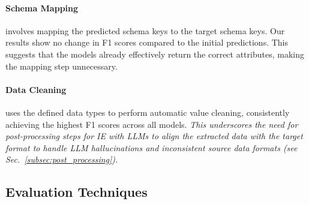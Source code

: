 \paragraph{Schema Mapping} involves mapping the predicted schema keys to the target schema keys. Our results show no change in F1 scores compared to the initial predictions. This suggests that the models already effectively return the correct attributes, making the mapping step unnecessary.

\paragraph{Data Cleaning} uses the defined data types to perform automatic value cleaning, consistently achieving the highest F1 scores across all models. \emph{This underscores the need for post-processing steps for IE with LLMs to align the extracted data with the target format to handle LLM hallucinations and inconsistent source data formats (see Sec.~\ref{subsec:post_processing}).}

\subsection{Evaluation Techniques}

